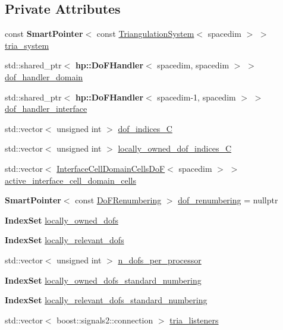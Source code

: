 \subsection*{Private Attributes}
\begin{DoxyCompactItemize}
\item 
const {\bf Smart\+Pointer}$<$ const \hyperlink{class_triangulation_system}{Triangulation\+System}$<$ spacedim $>$ $>$ \hyperlink{class_do_f_handler_system_a06d93193cb47591db138cd8f41953796}{tria\+\_\+system}
\item 
std\+::shared\+\_\+ptr$<$ {\bf hp\+::\+Do\+F\+Handler}$<$ spacedim, spacedim $>$ $>$ \hyperlink{class_do_f_handler_system_ac3c43d8113395b0011179231ff6c58aa}{dof\+\_\+handler\+\_\+domain}
\item 
std\+::shared\+\_\+ptr$<$ {\bf hp\+::\+Do\+F\+Handler}$<$ spacedim-\/1, spacedim $>$ $>$ \hyperlink{class_do_f_handler_system_aa9480c1fcf0d9170c026ef6611074d06}{dof\+\_\+handler\+\_\+interface}
\item 
std\+::vector$<$ unsigned int $>$ \hyperlink{class_do_f_handler_system_a15c27ca30c5905b44691779c755cd69c}{dof\+\_\+indices\+\_\+C}
\item 
std\+::vector$<$ unsigned int $>$ \hyperlink{class_do_f_handler_system_a7b2e77b2c718b0b13d861da7c0530b28}{locally\+\_\+owned\+\_\+dof\+\_\+indices\+\_\+C}
\item 
std\+::vector$<$ \hyperlink{class_interface_cell_domain_cells_do_f}{Interface\+Cell\+Domain\+Cells\+DoF}$<$ spacedim $>$ $>$ \hyperlink{class_do_f_handler_system_af0119b14377300f7f0457a18bb7dcd67}{active\+\_\+interface\+\_\+cell\+\_\+domain\+\_\+cells}
\item 
{\bf Smart\+Pointer}$<$ const \hyperlink{class_do_f_renumbering}{Do\+F\+Renumbering} $>$ \hyperlink{class_do_f_handler_system_aef6159c606a24ac7daadcd3fe082b3b6}{dof\+\_\+renumbering} = nullptr
\item 
{\bf Index\+Set} \hyperlink{class_do_f_handler_system_ad72a701a3581187eec846c831ba384c5}{locally\+\_\+owned\+\_\+dofs}
\item 
{\bf Index\+Set} \hyperlink{class_do_f_handler_system_a6b2de0e80cf0e67e62391cc84f8a7be5}{locally\+\_\+relevant\+\_\+dofs}
\item 
std\+::vector$<$ unsigned int $>$ \hyperlink{class_do_f_handler_system_acfe853db91a67d1f78e08d62d91bab1b}{n\+\_\+dofs\+\_\+per\+\_\+processor}
\item 
{\bf Index\+Set} \hyperlink{class_do_f_handler_system_a257ddb680d9f8276f7b802884dd8e577}{locally\+\_\+owned\+\_\+dofs\+\_\+standard\+\_\+numbering}
\item 
{\bf Index\+Set} \hyperlink{class_do_f_handler_system_a0e6744c40aada76d695f2c564f4c5040}{locally\+\_\+relevant\+\_\+dofs\+\_\+standard\+\_\+numbering}
\item 
std\+::vector$<$ boost\+::signals2\+::connection $>$ \hyperlink{class_do_f_handler_system_a286776a935dacb3d1c79a90f4ca7e5d8}{tria\+\_\+listeners}
\end{DoxyCompactItemize}

